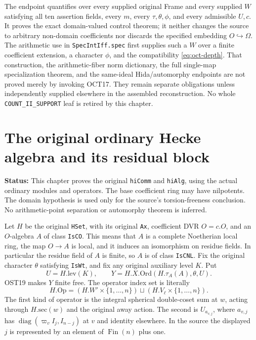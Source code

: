 \documentclass[11pt,a4paper]{article}
\numberwithin{equation}{section}
\theoremstyle{remark}\newtheorem{remark}[theorem]{Remark}
\newcommand{\status}[1]{\textbf{Status:} #1}
\begin{document}
The endpoint quantifies over every supplied original Frame
and every supplied $W$ satisfying all ten assertion
fields, every $m$, every $\tau,\theta,\phi$, and every
admissible $U,\allowbreak{} c$.  It proves the exact domain-valued control
theorem; it neither changes the source to arbitrary
non-domain coefficients nor discards the specified embedding
$O\hookrightarrow\Omega$.  The arithmetic use in
\texttt{Spec\allowbreak Int\allowbreak Iff.\allowbreak spec} first supplies such a $W$ over a
finite coefficient extension, a character $\phi$, and the
compatibility \eqref{eq:oct-depth}.  That construction,
the arithmetic-fiber norm dictionary, the full single-map
specialization theorem, and the same-ideal Hida/automorphy
endpoints are not proved merely by invoking OCT17.  They
remain separate obligations unless independently supplied
elsewhere in the assembled reconstruction.  No whole
\texttt{COUNT\_\allowbreak II\_\allowbreak SUPPORT} leaf is retired by this chapter.


\section{The original ordinary Hecke algebra and its residual block}
\label{sec:ordinary-hecke-algebra-v042}

\status{This chapter proves the original \texttt{hi\allowbreak Comm} and
\texttt{hi\allowbreak Alg}, using the actual ordinary modules and operators.
The base coefficient ring may have nilpotents. The domain hypothesis
is used only for the source's torsion-freeness conclusion. No
arithmetic-point separation or automorphy theorem is inferred.}

Let \(H\) be the original \texttt{HSet}, with its original
\texttt{Ax}, coefficient DVR \(O=c.O\), and an \(O\)-algebra \(A\)
of class \texttt{Is\allowbreak CO}. This means that \(A\) is a complete
Noetherian local ring, the map \(O\to A\) is local, and it induces
an isomorphism on residue fields. In particular the residue field
of \(A\) is finite, so \(A\) is of class \texttt{Is\allowbreak CNL}.
Fix the original character \(\theta\) satisfying \texttt{Is\allowbreak Wt},
and fix any original auxiliary level \(K\). Put
\[
 U=H.\mathrm{lev}(K),\qquad
 Y=H.X.\mathrm{Ord}(H.\tau_A(A),\theta,\allowbreak{} U).
\]
OST19 makes \(Y\) finite free. The operator index set is literally
\[
       H.\mathrm{Op}=(H.W'\times\{1,\ldots,\allowbreak{} n\})
                    \sqcup(H.V_\ell\times\{1,\ldots,\allowbreak{} n\}).
\]
The first kind of operator is the integral spherical double-coset
sum at \(w\), acting through \(H.\mathrm{sec}(w)\) and the original
away action. The second is \(U_{a_{v,\allowbreak{} j}}\), where \(a_{v,\allowbreak{} j}\) has
\(\operatorname{diag}(\varpi_v I_j,\allowbreak{} I_{n-j})\) at \(v\) and identity
elsewhere. In the source the displayed \(j\) is represented by
an element of \(\operatorname{Fin}(n)\) plus one.
\end{document}
